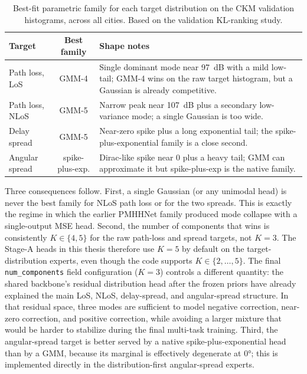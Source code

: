 \begin{table}[H]
\centering
\caption[Best-fit parametric family by target.]%
{Best-fit parametric family for each target distribution on the CKM
validation histograms, across all cities. Based on the validation
KL-ranking study.}
\label{tab:gmm_k_choice}
\begin{tabularx}{\textwidth}{lcX}
\toprule
Target & Best family & Shape notes \\
\midrule
Path loss, LoS   & GMM-4 & Single dominant mode near \SI{97}{dB} with a mild
                              low-tail; GMM-4 wins on the raw target
                              histogram, but a Gaussian is already
                              competitive. \\
Path loss, NLoS  & GMM-5 & Narrow peak near \SI{107}{dB} plus a secondary
                              low-variance mode; a single Gaussian is too
                              wide. \\
Delay spread     & GMM-5 & Near-zero spike plus a long exponential tail;
                              the spike-plus-exponential family is a close
                              second. \\
Angular spread   & spike-plus-exp. & Dirac-like spike near 0\textdegree{} plus
                              a heavy tail; GMM can approximate it but
                              spike-plus-exp is the native family. \\
\bottomrule
\end{tabularx}
\end{table}

Three consequences follow. First, a single Gaussian (or any unimodal head) is
never the best family for NLoS path loss or for the two spreads. This is
exactly the regime in which the earlier PMHHNet family produced mode collapse
with a single-output MSE head. Second, the number of components that wins is
consistently $K\in\{4, 5\}$ for the raw path-loss and spread targets, not
$K=3$. The Stage-A heads in this thesis therefore use $K=5$ by default on
the target-distribution experts, even though the code supports
$K\in\{2,\dots,5\}$. The final \texttt{num\_components} field
configuration (\(K=3\)) controls a different quantity: the shared backbone's
residual distribution head after the frozen priors have already
explained the main LoS, NLoS, delay-spread, and angular-spread structure. In
that residual space, three modes are sufficient to model negative correction,
near-zero correction, and positive correction, while avoiding a larger mixture
that would be harder to stabilize during the final multi-task training. Third, the
angular-spread target is better served by a native spike-plus-exponential
head than by a GMM, because its marginal is effectively degenerate at
\ang{0}; this is implemented directly in the distribution-first angular-spread
experts.

